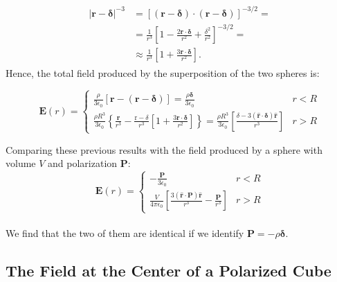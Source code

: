 \begin{equation}
	\begin{split}
		\begin{aligned}
			|\mathbf{r}-\boldsymbol{\delta}|^{-3} &=[(\mathbf{r}-\boldsymbol{\delta}) \cdot(\mathbf{r}-\boldsymbol{\delta})]^{-3 / 2} =\\
			&=\frac{1}{r^{3}}\left[1-\frac{2 \mathbf{r} \cdot \boldsymbol{\delta}}{r^{2}}+\frac{\delta^{2}}{r^{2}}\right]^{-3 / 2} =\\
			& \approx \frac{1}{r^{3}}\left[1+\frac{3 \mathbf{r} \cdot \boldsymbol{\delta}}{r^{2}}\right].
		\end{aligned}
	\end{split}
\end{equation}
Hence, the total field produced by the superposition of the two spheres is:

\begin{equation}
	\mathbf{E}(r)=\left\{\begin{array}{ll}
		\frac{\rho}{3 \epsilon_{0}}[\mathbf{r}-(\mathbf{r}-\boldsymbol{\delta})]=\frac{\rho \boldsymbol{\delta}}{3 \epsilon_{0}} & r<R \\
		\frac{\rho R^{3}}{3 \epsilon_{0}}\left\{\frac{\mathbf{r}}{r^{3}}-\frac{\mathrm{r}-\delta}{r^{3}}\left[1+\frac{3 \mathbf{r} \cdot \boldsymbol{\delta}}{r^{2}}\right]\right\}=\frac{\rho R^{3}}{3 \epsilon_{0}}\left[\frac{\delta-3(\hat{\mathbf{r}} \cdot \boldsymbol{\delta}) \hat{\mathbf{r}}}{r^{3}}\right] & r>R
	\end{array}\right.
\end{equation}

Comparing these previous results with the field produced by a sphere with volume $V$ and polarization
$\mathbf{P}:$
\begin{equation}
	\mathbf{E}(r)=\left\{\begin{array}{ll}
		-\frac{\mathbf{P}}{3 \epsilon_{0}} & r<R \\
		\frac{V}{4 \pi \epsilon_{0}}\left[\frac{3(\hat{\mathbf{r}} \cdot \mathbf{P}) \hat{\mathbf{r}}}{r^{3}}-\frac{\mathbf{P}}{r^{3}}\right] & r>R
	\end{array}\right.
\end{equation}\\
We find that the two of them are identical if we identify $\mathbf{P}=-\rho \boldsymbol{\delta}$.


\subsection{The Field at the Center of a Polarized Cube}\label{The Field at the Center of a Polarized Cube}

